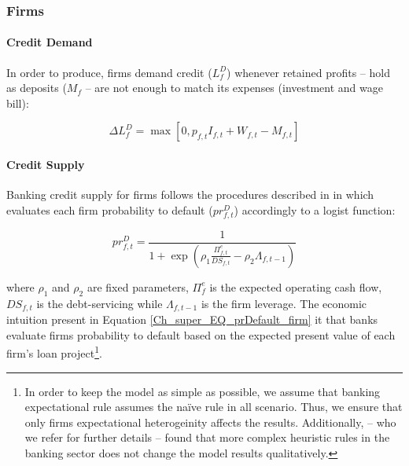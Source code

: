 \documentclass{SelfArx}
\begin{document}
\subsubsection{Firms}
\label{sec:org4a8ccf4}
\paragraph*{Credit Demand}
\label{sec:org2a4b155}

In order to produce, firms demand credit (\(L_{f}^{D}\)) whenever retained profits -- hold as deposits (\(M_{f}\) -- are not enough to match its expenses (investment and wage bill):

\begin{latex}
\begin{equation}
\Delta L^{D}_{f} = \max [0, p_{f,t}I_{f,t} + W_{f,t} - M_{f,t}]
\end{equation}
\end{latex}
\paragraph*{Credit Supply}
\label{sec:orgb592292}

Banking credit supply for firms follows the procedures described in \textcite{reissl_2020_Minsky,pedrosa_2021_What} in which evaluates each firm probability to default (\(pr^{D}_{f,t}\)) accordingly to a logist function:

\begin{latex}
\begin{equation}
\label{Ch_super_EQ_prDefault_firm}
pr^{D}_{f,t} = \frac{1}{1 + \exp\left( \rho_{1}\frac{\Pi^{e}_{f,t}}{DS_{f,t}} - \rho_{2}\Lambda_{f,t-1} \right)}
\end{equation}
\end{latex}
where \(\rho_{1}\) and \(\rho_{2}\) are fixed parameters, \(\Pi^{e}_{f}\) is the expected operating cash flow, \(DS_{f,t}\) is the debt-servicing while \(\Lambda_{f,t-1}\) is the firm leverage.
The economic intuition present in Equation \ref{Ch_super_EQ_prDefault_firm} it that banks evaluate firms probability to default based on the expected present value of each firm's loan project\footnote{In order to keep the model as simple as possible, we assume that banking expectational rule assumes the naïve rule in all scenario. Thus, we ensure that only firms expectational heterogeinity affects the results. Additionally, \textcite{reissl_2021_Heterogeneous} -- who we refer for further details --  found that more complex heuristic rules in the banking sector does not change the model results qualitatively.}.
\end{document}
